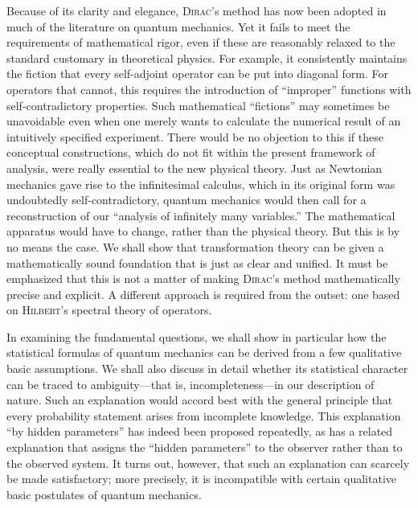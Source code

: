 \documentclass[fontsize=13pt,twoside,openany,headings=normal,parskip=false,bookmarkpackage=false,DIV=calc]{scrbook}
\begin{document}
Because of its clarity and elegance, \textsc{Dirac}'s method has now been adopted in much of the literature on quantum mechanics. Yet it fails to meet the requirements of mathematical rigor, even if these are reasonably relaxed to the standard customary in theoretical physics. For example, it consistently maintains the fiction that every self-adjoint operator can be put into diagonal form. For operators that cannot, this requires the introduction of ``improper'' functions with self-contradictory properties. Such mathematical ``fictions'' may sometimes be unavoidable even when one merely wants to calculate the numerical result of an intuitively specified experiment. There would be no objection to this if these conceptual constructions, which do not fit within the present framework of analysis, were really essential to the new physical theory. Just as Newtonian mechanics gave rise to the infinitesimal calculus, which in its original form was undoubtedly self-contradictory, quantum mechanics would then call for a reconstruction of our ``analysis of infinitely many variables.'' The mathematical apparatus would have to change, rather than the physical theory. But this is by no means the case. We shall show that transformation theory can be given a mathematically sound foundation that is just as clear and unified. It must be emphasized that this is not a matter of making \textsc{Dirac}'s method mathematically precise and explicit. A different approach is required from the outset: one based on \textsc{Hilbert}'s spectral theory of operators.

In examining the fundamental questions, we shall show in particular how the statistical formulas of quantum mechanics can be derived from a few qualitative basic assumptions. We shall also discuss in detail whether its statistical character can be traced to ambiguity---that is, incompleteness---in our description of nature. Such an explanation would accord best with the general principle that every probability statement arises from incomplete knowledge. This explanation ``by hidden parameters'' has indeed been proposed repeatedly, as has a related explanation that assigns the ``hidden parameters'' to the observer rather than to the observed system. It turns out, however, that such an explanation can scarcely be made satisfactory; more precisely, it is incompatible with certain qualitative basic postulates of quantum mechanics.
\hypertarget{origpage-3}{}%
\end{document}
